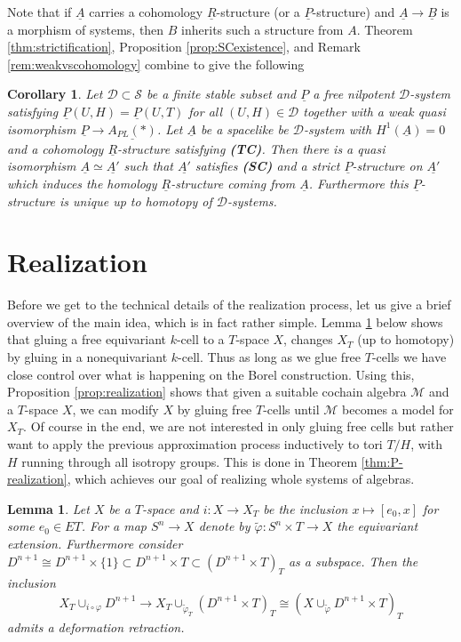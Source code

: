 \documentclass[12pt,a4paper]{article}
\newtheorem{cor}[thm]{Corollary}
\newtheorem{lem}[thm]{Lemma}
\theoremstyle{definition}
\begin{document}
Note that if $\underline{A}$ carries a cohomology $\underline{R}$-structure (or a $\underline{P}$-structure) and $\underline{A}\rightarrow\underline{B}$ is a morphism of systems, then $B$ inherits such a structure from $A$. Theorem \ref{thm:strictification}, Proposition \ref{prop:SCexistence}, and Remark \ref{rem:weakvscohomology} combine to give the following

\begin{cor}\label{cor:strictreplacement}
Let $\mathcal{D}\subset \mathcal{S}$ be a finite stable subset and $\underline{P}$ a free nilpotent $\mathcal{D}$-system satisfying $\underline{P}(U,H)=\underline{P}(U,T)$ for all $(U,H)\in \mathcal{D}$ together with a weak quasi isomorphism
$\underline{P}\rightarrow \underline{A_{PL}(*)}$. Let  $\underline{A}$ be a spacelike be $\mathcal{D}$-system with $H^1(\underline{A})=0$ and a cohomology $\underline{R}$-structure satisfying \textbf{(TC)}. Then there is a quasi isomorphism $\underline{A}\simeq \underline{A'}$ such that $\underline{A'}$ satisfies \textbf{(SC)} and a strict $\underline{P}$-structure on $\underline{A'}$ which induces the homology $\underline{R}$-structure coming from $\underline{A}$. Furthermore this $\underline{P}$-structure is unique up to homotopy of $\mathcal{D}$-systems.
\end{cor}


\section{Realization}
Before we get to the technical details of the realization process, let us give a brief overview of the main idea, which is in fact rather simple. Lemma \ref{lem:retract} below shows that gluing a free equivariant $k$-cell to a $T$-space $X$, changes $X_T$ (up to homotopy) by gluing in a nonequivariant $k$-cell. Thus as long as we glue free $T$-cells we have close control over what is happening on the Borel construction. Using this, Proposition \ref{prop:realization} shows that given a suitable cochain algebra $\mathcal{M}$ and a $T$-space $X$, we can modify $X$ by gluing free $T$-cells until $\mathcal{M}$ becomes a model for $X_T$. Of course in the end, we are not interested in only gluing free cells but rather want to apply the previous approximation process inductively to tori $T/H$, with $H$ running through all isotropy groups. This is done in Theorem \ref{thm:P-realization}, which achieves our goal of realizing whole systems of algebras.


\begin{lem}\label{lem:retract}
Let $X$ be a $T$-space and $i\colon X\rightarrow X_T$ be the inclusion $x\mapsto [e_0,x]$ for some $e_0\in ET$. For a map $S^n\rightarrow X$ denote by $\tilde{\varphi}\colon S^n\times T\rightarrow X$ the equivariant extension. Furthermore consider $D^{n+1}\cong D^{n+1}\times\{1\}\subset D^{n+1}\times T\subset (D^{n+1}\times T)_T$ as a subspace. Then the inclusion
\[ X_T\cup_{i\circ \varphi} D^{n+1}\longrightarrow  X_T\cup_{\tilde{\varphi}_T} (D^{n+1}\times T)_T \cong (X\cup_{\tilde{\varphi}} D^{n+1}\times T)_T\]
admits a deformation retraction.
\end{lem}
\end{document}
